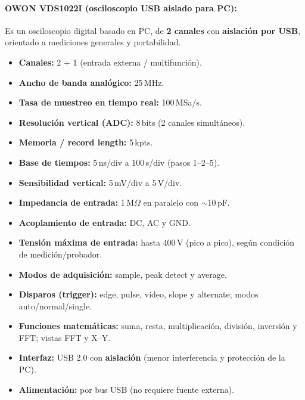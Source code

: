 \paragraph{OWON VDS1022I (osciloscopio USB aislado para PC):}
Es un osciloscopio digital basado en PC, de \textbf{2 canales} con \textbf{aislación por USB}, orientado a mediciones generales y portabilidad.

\begin{itemize}
	\item \textbf{Canales:} 2 + 1 (entrada externa / multifunción). 
	\item \textbf{Ancho de banda analógico:} 25\,MHz.
	\item \textbf{Tasa de muestreo en tiempo real:} 100\,MSa/s.
	\item \textbf{Resolución vertical (ADC):} 8\,bits (2 canales simultáneos).
	\item \textbf{Memoria / record length:} 5\,kpts.
	\item \textbf{Base de tiempos:} 5\,ns/div a 100\,s/div (pasos 1--2--5).
	\item \textbf{Sensibilidad vertical:} 5\,mV/div a 5\,V/div.
	\item \textbf{Impedancia de entrada:} 1\,M$\Omega$ en paralelo con $\sim$10\,pF.
	\item \textbf{Acoplamiento de entrada:} DC, AC y GND.
	\item \textbf{Tensión máxima de entrada:} hasta 400\,V (pico a pico), según condición de medición/probador.
	\item \textbf{Modos de adquisición:} sample, peak detect y average.
	\item \textbf{Disparos (trigger):} edge, pulse, video, slope y alternate; modos auto/normal/single.
	\item \textbf{Funciones matemáticas:} suma, resta, multiplicación, división, inversión y FFT; vistas FFT y X--Y.
	\item \textbf{Interfaz:} USB 2.0 con \textbf{aislación} (menor interferencia y protección de la PC).
	\item \textbf{Alimentación:} por bus USB (no requiere fuente externa).
\end{itemize}